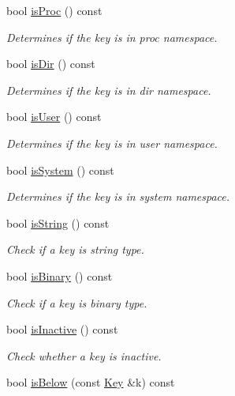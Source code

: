 \begin{DoxyCompactItemize}
bool \mbox{\hyperlink{classkdb_1_1Key_aa89cffb4d2a623920ff9abc086fde241}{is\+Proc}} () const
\begin{DoxyCompactList}\small\item\em Determines if the key is in proc namespace. \end{DoxyCompactList}\item 
bool \mbox{\hyperlink{classkdb_1_1Key_a0c60f261479e4e21cc5e9acd76c0d26b}{is\+Dir}} () const
\begin{DoxyCompactList}\small\item\em Determines if the key is in dir namespace. \end{DoxyCompactList}\item 
bool \mbox{\hyperlink{classkdb_1_1Key_a3b3d0d74246b259b10caed425216d91c}{is\+User}} () const
\begin{DoxyCompactList}\small\item\em Determines if the key is in user namespace. \end{DoxyCompactList}\item 
bool \mbox{\hyperlink{classkdb_1_1Key_a44833fb97b02ca58205c48d740c4cada}{is\+System}} () const
\begin{DoxyCompactList}\small\item\em Determines if the key is in system namespace. \end{DoxyCompactList}\item 
bool \mbox{\hyperlink{classkdb_1_1Key_a2170b1d9decef951b478454e3ee0b618}{is\+String}} () const
\begin{DoxyCompactList}\small\item\em Check if a key is string type. \end{DoxyCompactList}\item 
bool \mbox{\hyperlink{classkdb_1_1Key_ad748648cb25e2dc77972581e12a5b31c}{is\+Binary}} () const
\begin{DoxyCompactList}\small\item\em Check if a key is binary type. \end{DoxyCompactList}\item 
bool \mbox{\hyperlink{classkdb_1_1Key_a3a27bc4aa9dc8237ce2151ae37fde119}{is\+Inactive}} () const
\begin{DoxyCompactList}\small\item\em Check whether a key is inactive. \end{DoxyCompactList}\item 
bool \mbox{\hyperlink{classkdb_1_1Key_a2ced1c67613e5024f22563318567ed67}{is\+Below}} (const \mbox{\hyperlink{classkdb_1_1Key}{Key}} \&k) const

\end{DoxyCompactItemize}
